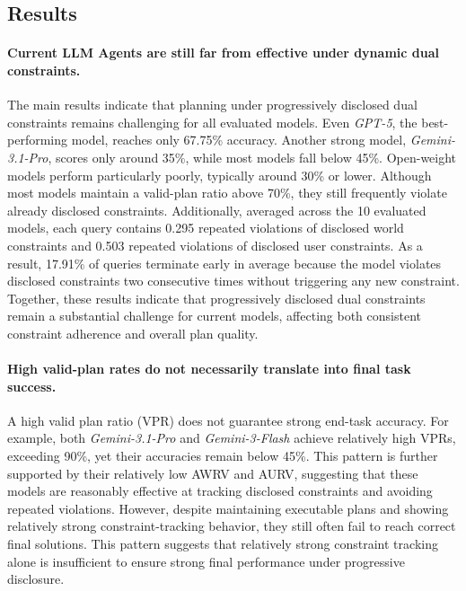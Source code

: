 \subsection{Results}

\paragraph{Current LLM Agents are still far from effective under dynamic dual constraints.}
The main results indicate that planning under progressively disclosed dual constraints remains challenging for all evaluated models. 
Even \textit{GPT-5}, the best-performing model, reaches only 67.75\% accuracy. 
Another strong model, \textit{Gemini-3.1-Pro}, scores only around 35\%, while most models fall below 45\%. 
Open-weight models perform particularly poorly, typically around 30\% or lower. 
Although most models maintain a valid-plan ratio above 70\%, they still frequently violate already disclosed constraints. 
Additionally, averaged across the 10 evaluated models, each query contains 0.295 repeated violations of disclosed world constraints and 0.503 repeated violations of disclosed user constraints.
As a result, 17.91\% of queries terminate early in average because the model violates disclosed constraints two consecutive times without triggering any new constraint. 
Together, these results indicate that progressively disclosed dual constraints remain a substantial challenge for current models, affecting both consistent constraint adherence and overall plan quality.

\paragraph{High valid-plan rates do not necessarily translate into final task success.}
A high valid plan ratio (VPR) does not guarantee strong end-task accuracy. 
For example, both \textit{Gemini-3.1-Pro} and \textit{Gemini-3-Flash} achieve relatively high VPRs, exceeding 90\%, yet their accuracies remain below 45\%. 
This pattern is further supported by their relatively low AWRV and AURV, suggesting that these models are reasonably effective at tracking disclosed constraints and avoiding repeated violations. 
However, despite maintaining executable plans and showing relatively strong constraint-tracking behavior, they still often fail to reach correct final solutions. 
This pattern suggests that relatively strong constraint tracking alone is insufficient to ensure strong final performance under progressive disclosure.

